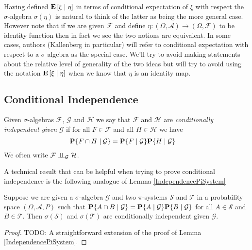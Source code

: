 Having defined $\cexpectationlong{\eta}{\xi}$ in terms of conditional
expectation of $\xi$ with respect the $\sigma$-algebra $\sigma(\eta)$
is natural to think of the latter as being the more general case.
However note that if we are given $\mathcal{F}$ and define $\eta :
(\Omega, \mathcal{A}) \to (\Omega, \mathcal{F})$ to be identity
function then in fact we see the two notions are equivalent.  In some
cases, authors (Kallenberg in particular) will refer to conditional
expectation with respect to a $\sigma$-algebra as the special case.
We'll try to avoid making statements about the relative level of
generality of the two ideas but will try to avoid using the notation
$\cexpectationlong{\eta}{\xi}$ when we know that $\eta$ is an
identity map.

\subsection{Conditional Independence}

\begin{defn}Given $\sigma$-algebras $\mathcal{F}$, $\mathcal{G}$ and
  $\mathcal{H}$ we say that $\mathcal{F}$ and $\mathcal{H}$ are
  \emph{conditionally independent given} $\mathcal{G}$ if for all $F
  \in \mathcal{F}$ and all $H \in \mathcal{H}$ we have 
\begin{align*}
\cprobability{\mathcal{G}}{F \cap H} &= \cprobability{\mathcal{G}}{F} \cprobability{\mathcal{G}}{H} 
\end{align*}
We often write $\cindependent{\mathcal{F}}{\mathcal{H}}{\mathcal{G}}$.
\end{defn}

A technical result that can be helpful when trying to prove
conditional independence is the following analogue of Lemma
\ref{IndependencePiSystem}
\begin{lem}\label{ConditionalIndependencePiSystem}Suppose we are given
  a $\sigma$-algebra $\mathcal{G}$ and two
  $\pi$-systems $\mathcal{S}$ and $\mathcal{T}$ in a probability space
  $(\Omega, \mathcal{A}, P)$ such that
  $\cprobability{\mathcal{G}}{A \cap B} = \cprobability{\mathcal{G}}{A} \cprobability{\mathcal{G}}{B}$ for all
  $A \in \mathcal{S}$ and $B \in \mathcal{T}$.  Then
  $\sigma(\mathcal{S})$ and $\sigma(\mathcal{T})$ are conditionally independent
  given $\mathcal{G}$.
\end{lem}
\begin{proof}
TODO: A straightforward extension of the proof of Lemma
\ref{IndependencePiSystem}.
\end{proof}

